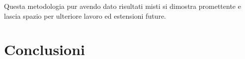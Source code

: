 \documentclass[12pt,a4paper,openright,twoside]{report}
\renewcommand{\chaptermark}[1]{\markboth{\thechapter.\ #1}{}}
\begin{document}
Questa metodologia pur avendo dato risultati misti si dimostra promettente e lascia spazio per ulteriore lavoro ed estensioni future. 

\chapter*{Conclusioni}    

\end{document}

